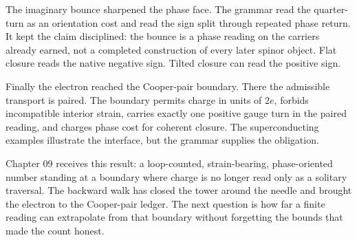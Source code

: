 The imaginary bounce sharpened the phase face. The grammar read the
quarter-turn as an orientation cost and read the sign split through repeated
phase return. It kept the claim disciplined: the bounce is a phase reading
on the carriers already earned, not a completed construction of every later
spinor object. Flat closure reads the native negative sign. Tilted closure
can read the positive sign.

Finally the electron reached the Cooper-pair boundary. There the admissible
transport is paired. The boundary permits charge in units of \(2e\), forbids
incompatible interior strain, carries exactly one positive gauge turn in the
paired reading, and charges phase cost for coherent closure. The
superconducting examples illustrate the interface, but the grammar supplies
the obligation.

Chapter 09 receives this result: a loop-counted, strain-bearing,
phase-oriented number standing at a boundary where charge is no longer read
only as a solitary traversal. The backward walk has closed the tower around
the needle and brought the electron to the Cooper-pair ledger. The next
question is how far a finite reading can extrapolate from that boundary
without forgetting the bounds that made the count honest.
